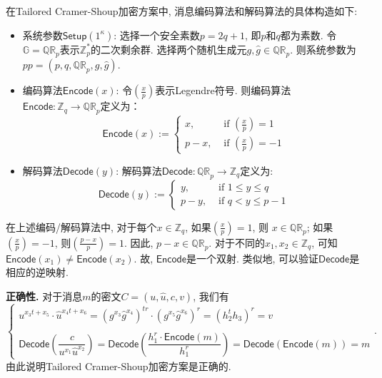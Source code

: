 在Tailored Cramer-Shoup加密方案中, 消息编码算法和解码算法的具体构造如下:
\begin{itemize}[noitemsep,topsep=0pt]
\item 系统参数$\mathsf{Setup}(1^\kappa)$: 选择一个安全素数$p=2q+1$, 即$p$和$q$都为素数. 令$\mathbb{G} = \mathbb{QR}_p$表示$\mathbb{Z}_p^*$的二次剩余群. 选择两个随机生成元$g,\hat{g} \in \mathbb{QR}_p$. 则系统参数为$pp = (p, q, \mathbb{QR}_p, g, \hat{g})$.

\item 编码算法$\mathsf{Encode}(x)$: 令$\left(\frac{x}{p}\right)$表示Legendre符号. 则编码算法$\mathsf{Encode}: \mathbb{Z}_q \rightarrow \mathbb{QR}_p$定义为：
\begin{displaymath}
\mathsf{Encode}(x) := \left\{\begin{array}{ll}
x,   & \textrm{ if } \left(\frac{x}{p}\right) = 1  \\
p-x, & \textrm{ if } \left(\frac{x}{p}\right) = -1
\end{array}
\right.
\end{displaymath}

\item 解码算法$\mathsf{Decode}(y)$: 解码算法$\mathsf{Decode}: \mathbb{QR}_p \rightarrow \mathbb{Z}_q$定义为:
\[
\mathsf{Decode}(y) := \left\{\begin{array}{ll}
  y, & \textrm{ if } 1 \leq  y \leq q \\
p-y, & \textrm{ if } q < y \leq p-1
\end{array}
\right.
\]
\end{itemize}

在上述编码/解码算法中, 对于每个$x \in \mathbb{Z}_q$, 如果$\left(\frac{x}{p}\right) = 1$, 则 $x \in \mathbb{QR}_p$; 如果$\left(\frac{x}{p}\right) = -1$, 则$\left(\frac{p - x}{p}\right) = 1$. 因此, $p - x \in \mathbb{QR}_p$. 对于不同的$x_1, x_2 \in \mathbb{Z}_q$, 可知$\mathsf{Encode}(x_1) \neq \mathsf{Encode}(x_2)$. 故, $\mathsf{Encode}$是一个双射. 类似地, 可以验证$\mathsf{Decode}$是相应的逆映射.

\begin{trivlist}
\item \textbf{正确性.} 对于消息$m$的密文$C = (u, \hat{u}, c, v)$, 我们有
\begin{displaymath}
\left\{\begin{array}{l}
u^{x_3t + x_5} \cdot \hat{u}^{x_4t + x_6} = (g^{x_3}\hat{g}^{x_4})^{tr} \cdot (g^{x_5}\hat{g}^{x_6})^r = (h_2^th_3)^r = v\\\\
\mathsf{Decode}\left(\dfrac{c}{u^{x_1}\hat{u}^{x_2}}\right) = \mathsf{Decode}\left(\dfrac{h_1^r \cdot \mathsf{Encode}(m)}{h_1^r}\right) = \mathsf{Decode}(\mathsf{Encode}(m))=m
\end{array}\right..
\end{displaymath}
由此说明Tailored Cramer-Shoup加密方案是正确的.
\end{trivlist}

